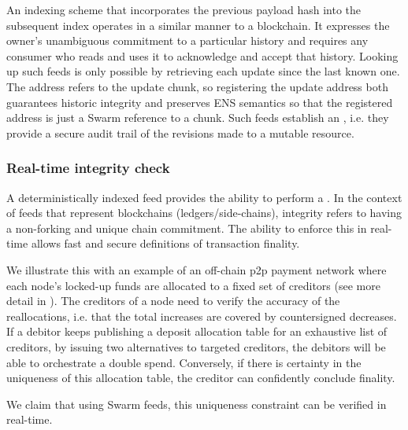 An indexing scheme that incorporates the previous payload hash into the subsequent index operates in a similar manner to a blockchain. It expresses the owner's unambiguous commitment to a particular history and requires any consumer who reads and uses it to acknowledge and accept that history. 
Looking up such feeds is only possible by retrieving each update since the last known one. The address refers to the update chunk, so registering the update address both guarantees historic integrity and preserves ENS semantics so that the registered address is just a Swarm reference to a chunk.
Such feeds establish an , i.e. they provide a secure audit trail of the revisions made to a mutable resource. 

\subsubsection{Real-time integrity check}

A deterministically indexed feed provides the ability to perform a . In the context of feeds that represent blockchains (ledgers/side-chains), integrity refers to having a non-forking and unique chain commitment. The ability to enforce this in real-time allows fast and secure definitions of transaction finality. 

We illustrate this with an example of an off-chain p2p payment network where each node's locked-up funds are allocated to a fixed set of creditors (see more detail in \cite{ethersphere2019swap}). The creditors of a node need to verify the accuracy of the reallocations, i.e. that the total increases are covered by countersigned decreases. 
If a debitor keeps publishing a deposit allocation table for an exhaustive list of creditors, by issuing two alternatives to targeted creditors, the debitors will be able to orchestrate a double spend. Conversely, if there is certainty in the uniqueness of this allocation table, the creditor can confidently conclude finality.

We claim that using Swarm feeds, this uniqueness constraint can be verified in real-time.

